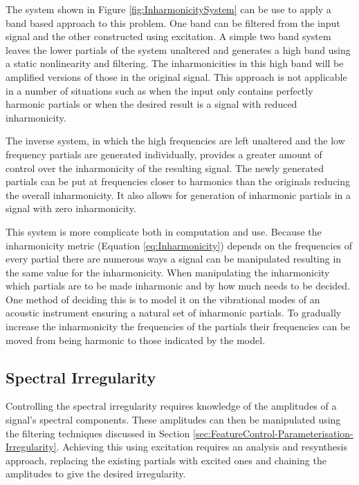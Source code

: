 		The system shown in Figure \ref{fig:InharmonicitySystem} can be use to apply a band based approach to
		this problem. One band can be filtered from the input signal and the other constructed using excitation.
		A simple two band system leaves the lower partials of the system unaltered and generates a high band using
		a static nonlinearity and filtering. The inharmonicities in this high band will be amplified versions of
		those in the original signal. This approach is not applicable in a number of situations such as when the
		input only contains perfectly harmonic partials or when the desired result is a signal with reduced
		inharmonicity.

		The inverse system, in which the high frequencies are left unaltered and the low frequency partials are
		generated individually, provides a greater amount of control over the inharmonicity of the resulting
		signal. The newly generated partials can be put at frequencies closer to harmonics than the originals
		reducing the overall inharmonicity. It also allows for generation of inharmonic partials in a signal with
		zero inharmonicity. 

		This system is more complicate both in computation and use. Because the inharmonicity metric (Equation
		\ref{eq:Inharmonicity}) depends on the frequencies of every partial there are numerous ways a signal can be
		manipulated resulting in the same value for the inharmonicity. When manipulating the inharmonicity which
		partials are to be made inharmonic and by how much needs to be decided. One method of deciding this is to
		model it on the vibrational modes of an acoustic instrument ensuring a natural set of inharmonic partials.
		To gradually increase the inharmonicity the frequencies of the partials their frequencies can be moved from
		being harmonic to those indicated by the model.

	\subsection{Spectral Irregularity}
	\label{sec:FeatureControl-Control-Irregularity}
		Controlling the spectral irregularity requires knowledge of the amplitudes of a signal's spectral
		components. These amplitudes can then be manipulated using the filtering techniques discussed in Section
		\ref{sec:FeatureControl-Parameterisation-Irregularity}. Achieving this using excitation requires an
		analysis and resynthesis approach, replacing the existing partials with excited ones and chaining the
		amplitudes to give the desired irregularity. 

